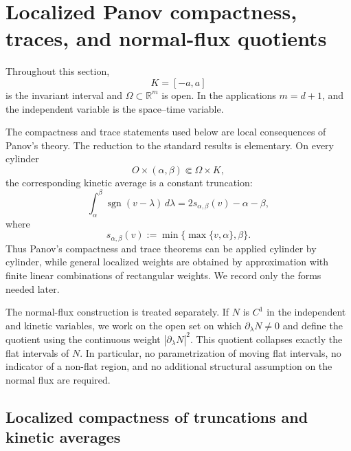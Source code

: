 \documentclass[11pt]{amsart}
\numberwithin{equation}{section}
\theoremstyle{plain}
\theoremstyle{definition}
\theoremstyle{remark}
\begin{document}
\section{Localized Panov compactness, traces, and normal-flux quotients}
\label{sec:quasi-averaging-traces}

Throughout this section,
\[
    K=[-a,a]
\]
is the invariant interval and \(\Omega\subset\mathbb R^m\) is open.  In the
applications \(m=d+1\), and the independent variable is the space--time
variable.

The compactness and trace statements used below are local consequences of
Panov's theory.  The reduction to the standard results is elementary.  On
every cylinder
\[
    O\times(\alpha,\beta)\Subset\Omega\times K,
\]
the corresponding kinetic average is a constant truncation:
\begin{equation}
\label{eq:constant-truncation-sign-identity}
    \int_\alpha^\beta
        \operatorname{sgn}(v-\lambda)\,d\lambda
    =
    2s_{\alpha,\beta}(v)-\alpha-\beta,
\end{equation}
where
\[
    s_{\alpha,\beta}(v)
    :=
    \min\{\max\{v,\alpha\},\beta\}.
\]
Thus Panov's compactness and trace theorems can be applied cylinder by
cylinder, while general localized weights are obtained by approximation with
finite linear combinations of rectangular weights.  We record only the forms
needed later.

The normal-flux construction is treated separately.  If \(N\) is \(C^1\) in
the independent and kinetic variables, we work on the open set on which
\(\partial_\lambda N\neq0\) and define the quotient using the continuous
weight \(|\partial_\lambda N|^2\).  This quotient collapses exactly the flat
intervals of \(N\).  In particular, no parametrization of moving flat
intervals, no indicator of a non-flat region, and no additional structural
assumption on the normal flux are required.

\subsection{Localized compactness of truncations and kinetic averages}
\label{subsec:localized-panov-compactness}
\end{document}
